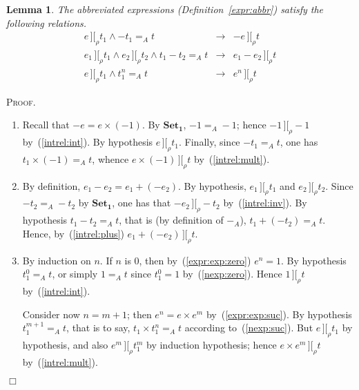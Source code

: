 \documentclass{article}
\newtheorem{lemma}[definition]{Lemma}
\newenvironment{proof}{\smallskip\textsc{Proof.}}{\hspace*{\fill}$\Box$}
\newcommand{\intII}{\,]\![}
\newcommand{\intrel}{\mathbin{\intII_{\rho}}}
\newcommand{\axiom}[1]{\ensuremath{\mathbf{#1}}}
\begin{document}
\begin{lemma}\label{intrel:abbr} The abbreviated expressions
(Definition~\ref{expr:abbr}) satisfy the following relations.
\begin{eqnarray}
\label{intrel:inv}
e\intrel t_1 \wedge -t_1=_A t & \rightarrow & -e\intrel t\\
\label{intrel:minus}
e_1\intrel t_1 \wedge e_2\intrel t_2 \wedge t_1-t_2=_A t
 & \rightarrow & e_1-e_2\intrel t\\
\label{intrel:nexp}
e\intrel t_1 \wedge t_1^n=_A t & \rightarrow & e^n\intrel t
\end{eqnarray}
\end{lemma}
\begin{proof}
\begin{enumerate}[(1)]%
\setcounter{enumi}{\ref{intrel:inv}}\addtocounter{enumi}{-1}
\item Recall that $-e=e\times(-1)$.  By \axiom{Set_1}, $-1=_A -1$;
hence $-1\intrel -1$ by~(\ref{intrel:int}).  By hypothesis $e\intrel
t_1$.  Finally, since $-t_1=_A t$, one has $t_1\times(-1)=_A t$, whence
$e\times(-1)\intrel t$ by~(\ref{intrel:mult}).
\item By definition, $e_1-e_2=e_1+(-e_2)$.  By hypothesis, $e_1\intrel
t_1$ and $e_2\intrel t_2$.  Since $-t_2=_A -t_2$ by \axiom{Set_1}, one
has that $-e_2\intrel -t_2$ by~(\ref{intrel:inv}).  By hypothesis
$t_1-t_2=_A t$, that is (by definition of $-_A$), $t_1+(-t_2)=_A t$.
Hence, by~(\ref{intrel:plus}) $e_1+(-e_2)\intrel t$.
\item By induction on $n$.  If $n$ is $0$, then
by~(\ref{expr:exp:zero}) $e^n=1$.  By hypothesis $t_1^0=_A t$, or simply
$1=_A t$ since $t_1^0=1$ by~(\ref{nexp:zero}).  Hence $1\intrel t$
by~(\ref{intrel:int}).

Consider now $n=m+1$; then $e^n=e\times e^m$ by~(\ref{expr:exp:suc}).
By hypothesis $t_1^{m+1}=_A t$, that is to say, $t_1\times t_1^n=_A t$
according to~(\ref{nexp:suc}).  But $e\intrel t_1$ by hypothesis, and
also $e^m\intrel t_1^m$ by induction hypothesis; hence $e\times
e^m\intrel t$ by~(\ref{intrel:mult}).
\end{enumerate}
\end{proof}
\end{document}
